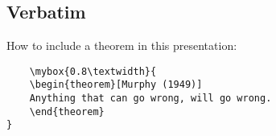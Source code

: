 \clearpage


\subsection{Verbatim}

How to include a theorem in this presentation:
\begin{verbatim}
    \mybox{0.8\textwidth}{
    \begin{theorem}[Murphy (1949)]
    Anything that can go wrong, will go wrong.
    \end{theorem}
}
\end{verbatim}

\clearpage